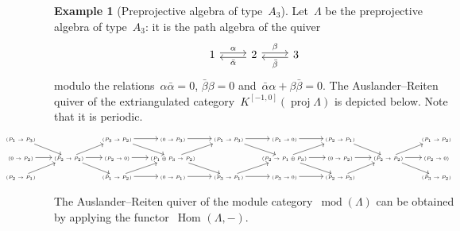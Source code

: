 \documentclass{amsart}
\theoremstyle{definition}
\newtheorem{example}[theorem]{Example}
\newcommand{\Hom}[1]{\operatorname{Hom}_{#1}}
\newcommand{\MOD}{\operatorname{mod}}
\newcommand{\proj}{\operatorname{proj}}
\begin{document}
\begin{example}[Preprojective algebra of type~$A_3$]
 Let~$\Lambda$ be the preprojective algebra of type~$A_3$: it is the path algebra of the quiver
 \[
 \begin{tikzcd}
  1\arrow[r, shift left = 2pt, "\alpha"] & 2\arrow[l, shift left = 2pt, "\bar \alpha"] \arrow[r, shift left = 2pt, "\beta"]& 3\arrow[l, shift left = 2pt, "\bar \beta"]
 \end{tikzcd}
 \] 
 modulo the relations~$\alpha \bar \alpha = 0$, $\bar \beta \beta = 0$ and~$\bar \alpha \alpha + \beta \bar \beta = 0$. 
 The Auslander--Reiten quiver of the extriangulated category~$K^{[-1,0]}(\proj \Lambda)$ is depicted below.  Note that it is periodic.
 
 \[
  \hspace*{-2cm}
 {\tiny
  \begin{tikzcd}
   (P_1 \to P_3)\arrow[dr] && (P_3\to P_2)\arrow[r]\arrow[dr] & (0\to P_3)\arrow[r]& (P_1\to P_3)\arrow[r]\arrow[dr] & (P_1\to 0)\arrow[r] & (P_2\to P_1)\arrow[dr]&& (P_1\to P_2) \\
   (0\to P_2)\ar[r] & (P_2\to P_2)\arrow[ur]\arrow[dr]\arrow[r] & (P_2\to 0)\arrow[r] & (P_1\oplus P_3\to P_2)\arrow[ur]\arrow[dr] && (P_2\to P_1\oplus P_3)\arrow[ur]\arrow[dr]\arrow[r] & (0\to P_2)\arrow[r] & (P_2\to P_2)\arrow[ur]\arrow[dr]\arrow[r] & (P_2\to 0) \\
   (P_2\to P_1)\arrow[ur] && (P_1\to P_2)\arrow[ur]\arrow[r] & (0\to P_1)\arrow[r] & (P_3\to P_1)\arrow[r]\arrow[ur] & (P_3\to 0)\arrow[r] & (P_2\to P_3)\arrow[ur] && (P_3\to P_2)
  \end{tikzcd}
  }
 \]

 The Auslander--Reiten quiver of the module category~$\MOD(\Lambda)$ can be obtained by applying the functor~$\Hom{}(\Lambda, -)$.
 

\end{example}
\end{document}

